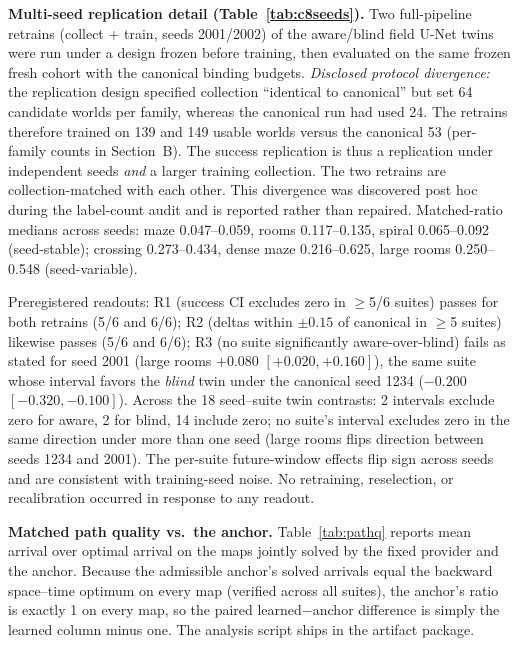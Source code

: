\documentclass[letterpaper]{article} %
\begin{document}
\textbf{Multi-seed replication detail (Table~\ref{tab:c8seeds}).} Two full-pipeline retrains (collect + train, seeds 2001/2002) of the aware/blind field U-Net twins were run under a design frozen before training, then evaluated on the same frozen fresh cohort with the canonical binding budgets. \emph{Disclosed protocol divergence:} the replication design specified collection ``identical to canonical'' but set 64 candidate worlds per family, whereas the canonical run had used 24. The retrains therefore trained on 139 and 149 usable worlds versus the canonical 53 (per-family counts in Section~B). The success replication is thus a replication under independent seeds \emph{and} a larger training collection. The two retrains are collection-matched with each other. This divergence was discovered post hoc during the label-count audit and is reported rather than repaired. Matched-ratio medians across seeds: maze 0.047--0.059, rooms 0.117--0.135, spiral 0.065--0.092 (seed-stable); crossing 0.273--0.434, dense maze 0.216--0.625, large rooms 0.250--0.548 (seed-variable).

Preregistered readouts: R1 (success CI excludes zero in $\geq$5/6 suites) passes for both retrains (5/6 and 6/6); R2 (deltas within $\pm 0.15$ of canonical in $\geq$5 suites) likewise passes (5/6 and 6/6); R3 (no suite significantly aware-over-blind) fails as stated for seed 2001 (large rooms $+0.080$ $[+0.020,+0.160]$), the same suite whose interval favors the \emph{blind} twin under the canonical seed 1234 ($-0.200$ $[-0.320,-0.100]$). Across the 18 seed--suite twin contrasts: 2 intervals exclude zero for aware, 2 for blind, 14 include zero; no suite's interval excludes zero in the same direction under more than one seed (large rooms flips direction between seeds 1234 and 2001). The per-suite future-window effects flip sign across seeds and are consistent with training-seed noise. No retraining, reselection, or recalibration occurred in response to any readout.

\textbf{Matched path quality vs.\ the anchor.} Table~\ref{tab:pathq} reports mean arrival over optimal arrival on the maps jointly solved by the fixed provider and the anchor. Because the admissible anchor's solved arrivals equal the backward space--time optimum on every map (verified across all suites), the anchor's ratio is exactly 1 on every map, so the paired learned$-$anchor difference is simply the learned column minus one. The analysis script ships in the artifact package.
\end{document}

